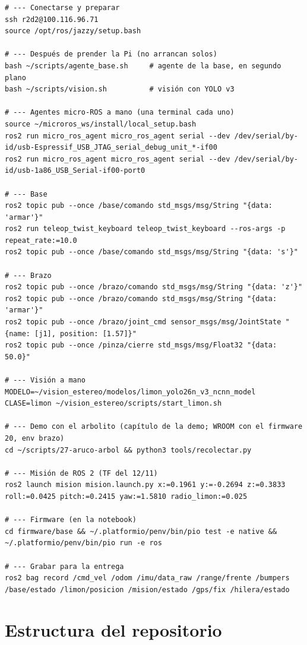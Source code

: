 \begin{lstlisting}[language=consola]
# --- Conectarse y preparar
ssh r2d2@100.116.96.71
source /opt/ros/jazzy/setup.bash

# --- Después de prender la Pi (no arrancan solos)
bash ~/scripts/agente_base.sh     # agente de la base, en segundo plano
bash ~/scripts/vision.sh          # visión con YOLO v3

# --- Agentes micro-ROS a mano (una terminal cada uno)
source ~/microros_ws/install/local_setup.bash
ros2 run micro_ros_agent micro_ros_agent serial --dev /dev/serial/by-id/usb-Espressif_USB_JTAG_serial_debug_unit_*-if00
ros2 run micro_ros_agent micro_ros_agent serial --dev /dev/serial/by-id/usb-1a86_USB_Serial-if00-port0

# --- Base
ros2 topic pub --once /base/comando std_msgs/msg/String "{data: 'armar'}"
ros2 run teleop_twist_keyboard teleop_twist_keyboard --ros-args -p repeat_rate:=10.0
ros2 topic pub --once /base/comando std_msgs/msg/String "{data: 's'}"

# --- Brazo
ros2 topic pub --once /brazo/comando std_msgs/msg/String "{data: 'z'}"
ros2 topic pub --once /brazo/comando std_msgs/msg/String "{data: 'armar'}"
ros2 topic pub --once /brazo/joint_cmd sensor_msgs/msg/JointState "{name: [j1], position: [1.57]}"
ros2 topic pub --once /pinza/cierre std_msgs/msg/Float32 "{data: 50.0}"

# --- Visión a mano
MODELO=~/vision_estereo/modelos/limon_yolo26n_v3_ncnn_model CLASE=limon ~/vision_estereo/scripts/start_limon.sh

# --- Demo con el arbolito (capítulo de la demo; WROOM con el firmware 20, env brazo)
cd ~/scripts/27-aruco-arbol && python3 tools/recolectar.py

# --- Misión de ROS 2 (TF del 12/11)
ros2 launch mision mision.launch.py x:=0.1961 y:=-0.2694 z:=0.3833 roll:=0.0425 pitch:=0.2415 yaw:=1.5810 radio_limon:=0.025

# --- Firmware (en la notebook)
cd firmware/base && ~/.platformio/penv/bin/pio test -e native && ~/.platformio/penv/bin/pio run -e ros

# --- Grabar para la entrega
ros2 bag record /cmd_vel /odom /imu/data_raw /range/frente /bumpers /base/estado /limon/posicion /mision/estado /gps/fix /hilera/estado
\end{lstlisting}

\section{Estructura del repositorio}


